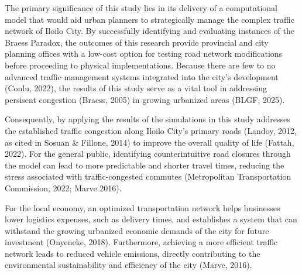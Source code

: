 The primary significance of this study lies in its delivery of a computational model that would aid urban planners to strategically manage the complex traffic network of Iloilo City. By successfully identifying and evaluating instances of the Braess Paradox, the outcomes of this research provide provincial and city planning offices with a low-cost option for testing road network modifications before proceeding to physical implementations. Because there are few to no advanced traffic management systems integrated into the city's development (Conlu, 2022), the results of this study serve as a vital tool in addressing persisent congestion (Braess, 2005) in growing urbanized areas (BLGF, 2025).

Consequently, by applying the results of the simulations in this study addresses the established traffic congestion along Iloilo City's primary roads (Landoy, 2012, as cited in Sosuan \& Fillone, 2014) to improve the overall quality of life (Fattah, 2022). For the general public, identifying counterintuitive road closures through the model can lead to more predictable and shorter travel times, reducing the stress associated with traffic-congested commutes (Metropolitan Transportation Commission, 2022; Marve 2016).

For the local economy, an optimized transportation network helps businesses lower logistics expenses, such as delivery times, and establishes a system that can withstand the growing urbanized economic demands of the city for future investment (Onyeneke, 2018). Furthermore, achieving a more efficient traffic network leads to reduced vehicle emissions, directly contributing to the environmental sustainability and efficiency of the city  (Marve, 2016).


